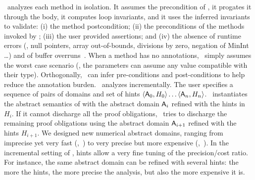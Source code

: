 \documentclass{llncs}
\begin{document}
\Clousot\ analyzes each method  in isolation.
It assumes the precondition of , it progates it through the body, it computes loop invariants, and  it uses the inferred invariants to validate: (i) the method postcondition; (ii) the preconditions of the methods invoked by ; (iii) the user provided assertions; and (iv) the absence of runtime errors (\eg, null pointers, array out-of-bounds, divisions by zero, negation of MinInt \dots) and of buffer overruns~\cite{FerraraLogozzoMaf08}.
When a method has no annotations, \Clousot\ simply assumes the worst case scenario (\eg, the parameters can assume any value compatible with their type).
Orthogonally, \Clousot\ can infer pre-conditions and post-conditions to help reduce the annotation burden.
\Clousot\ analyzes   incrementally.
 The user specifies a sequence of pairs of domains and set of hints $\langle {\mathsf{A}}_0, H_0 \rangle \dots \langle {\mathsf{A}}_n, H_n \rangle$.
\Clousot\ instantiates the abstract semantics of  with the abstract domain ${\mathsf{A}}_i$ refined with the hints in $H_i$.
If it cannot discharge all the proof obligations, \Clousot\ tries to discharge the remaining proof obligations using the abstract domain ${\mathsf{A}}_{i+1}$ refined with the hints $H_{i+1}$.
We designed new numerical abstract domains, ranging from
imprecise yet very fast (\Pentagons,~\cite{LogozzoMaf08}) to very precise but more expensive (\SubPoly,~\cite{LavironLogozzo09}).
In the incremental setting of \Clousot, hints allow a very fine tuning of the precision/cost ratio.
For instance, the same abstract domain can be refined with several hints:
the more the hints, the more precise the analysis, but also the more expensive it is.
\end{document}
